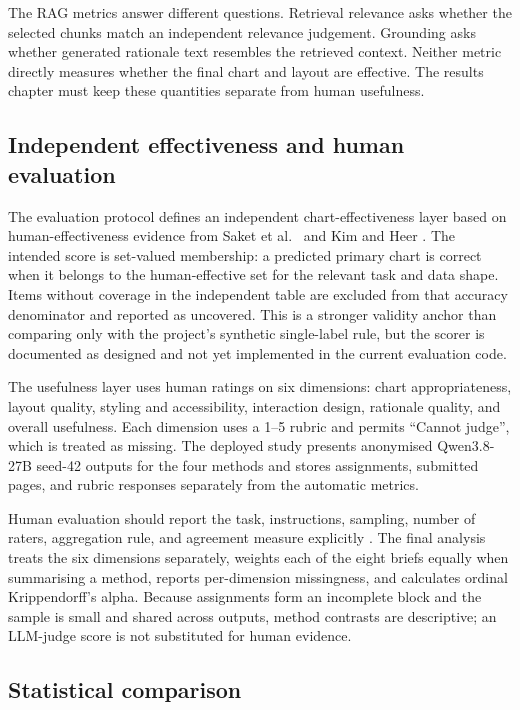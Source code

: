 The RAG metrics answer different questions. Retrieval relevance asks whether the selected chunks match an independent relevance judgement. Grounding asks whether generated rationale text resembles the retrieved context. Neither metric directly measures whether the final chart and layout are effective. The results chapter must keep these quantities separate from human usefulness.

\subsection{Independent effectiveness and human evaluation}

The evaluation protocol defines an independent chart-effectiveness layer based on human-effectiveness evidence from Saket et al.~\cite{saket2019taskbased} and Kim and Heer \cite{kim2018taskdata}. The intended score is set-valued membership: a predicted primary chart is correct when it belongs to the human-effective set for the relevant task and data shape. Items without coverage in the independent table are excluded from that accuracy denominator and reported as uncovered. This is a stronger validity anchor than comparing only with the project's synthetic single-label rule, but the scorer is documented as designed and not yet implemented in the current evaluation code.

The usefulness layer uses human ratings on six dimensions: chart appropriateness, layout quality, styling and accessibility, interaction design, rationale quality, and overall usefulness. Each dimension uses a 1--5 rubric and permits ``Cannot judge'', which is treated as missing. The deployed study presents anonymised Qwen3.8-27B seed-42 outputs for the four methods and stores assignments, submitted pages, and rubric responses separately from the automatic metrics.

Human evaluation should report the task, instructions, sampling, number of raters, aggregation rule, and agreement measure explicitly \cite{vanderlee2019human}. The final analysis treats the six dimensions separately, weights each of the eight briefs equally when summarising a method, reports per-dimension missingness, and calculates ordinal Krippendorff's alpha. Because assignments form an incomplete block and the sample is small and shared across outputs, method contrasts are descriptive; an LLM-judge score is not substituted for human evidence.

\subsection{Statistical comparison}

